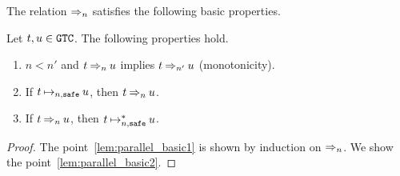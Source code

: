 The relation $\mathbin{\Rightarrow_{n}}$ satisfies the following basic properties. 
\begin{lemma}\label{lem:parallel_basic}
  Let $t, u\in {\tt GTC}$. The following properties hold. 
  \begin{enumerate}
  \item\label{lem:parallel_basic1}
    $n < n'$ and $t \mathbin{\Rightarrow_{n}} u$ implies $t \mathbin{\Rightarrow_{n'}} u$ (monotonicity). 
  \item\label{lem:parallel_basic2}
    If $t \mathbin{\mathbin{\mapsto}_{n,{\hbox{\scriptsize \tt safe}}}} u$, then $t \mathbin{\Rightarrow_{n}} u$. 
  \item\label{lem:parallel_basic3}
    If $t \mathbin{\Rightarrow_{n}} u$, then $t \mathbin{\mathbin{\mapsto}_{n,{\hbox{\scriptsize \tt safe}}}^*} u$. 
  \end{enumerate}
\end{lemma}
\begin{proof}
  The point~\ref{lem:parallel_basic1} is shown by induction on $\mathbin{\Rightarrow_{n}}$.
  We show the point~\ref{lem:parallel_basic2}.
  
  

\end{proof}
